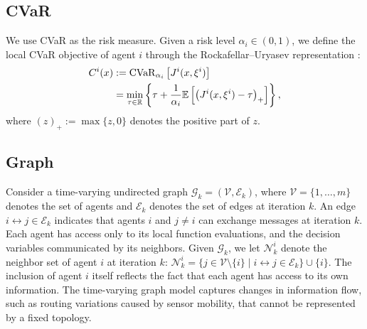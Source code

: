\documentclass[twocolumn]{autart}    %
\newcommand{\1}{\mathbf{1}}
\begin{document}
\subsection{CVaR} 
We use CVaR as the risk measure. 
Given a risk level $\alpha_i\in(0,1)$, 
we define the local CVaR objective of agent $i$ through the Rockafellar--Uryasev representation \cite{rockafellar2000optimization}:
\begin{equation*}
    \begin{aligned}
       C^i(x) & :={\rm{CVaR}}_{\alpha_i}\left[J^i(x,\xi^i)\right]  \\
     & = \min_{\tau\in\mathbb{R}}
     \left\{\tau+\frac{1}{\alpha_i}
     \mathbb{E}\left[\left(J^i(x,\xi^i)-\tau\right)_+\right]\right\},
    \end{aligned}
\end{equation*}
where $(z)_+:=\max\{z,0\}$ denotes the positive part of $z$.
 

 
\subsection{Graph}
Consider a time-varying undirected graph $\mathcal{G}_k = (\mathcal{V}, \mathcal{E}_k)$, where $\mathcal{V} = \{1, \dots, m\}$ denotes the set of agents and $\mathcal{E}_k$ denotes the set of edges at iteration $k$. An edge $i \leftrightarrow j \in \mathcal{E}_k$ indicates that agents $i$ and $j \neq i $ can exchange messages at iteration $k$.  
Each agent has access only to its local function evaluations, 
and the decision variables communicated by its neighbors.
Given $\mathcal{G}_k$, we let $\mathcal{N}_k^i$ denote the neighbor set of agent $i$ at iteration $k$: $\mathcal{N}_k^i  = \{j \in \mathcal{V} \setminus\{i\}  \mid i \leftrightarrow j \in \mathcal{E}_k\} \cup \{i\}$. The inclusion of agent $i$ itself reflects the fact that each agent has access to its own information.  
The time-varying graph model captures changes in information flow, such as routing variations caused by sensor mobility, that cannot be represented by a fixed topology.
\end{document}
